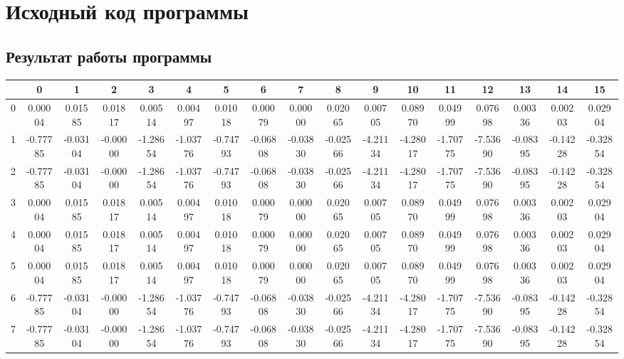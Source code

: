 \documentclass[11pt]{article}
\begin{document}
\section{Исходный код программы}
\small

\pagebreak{}
\begin{landscape}
\section{Результат работы программы}
\footnotesize
\begin{tabular}{|c|c|c|c|c|c|c|c|c|c|c|c|c|c|c|c|c|}
\hline
&0 & 1 & 2 & 3 & 4 & 5 & 6 & 7 & 8 & 9 & 10 & 11 & 12 & 13 & 14 & 15\\
\hline
   0 & 0.00004 &   0.01585 &   0.01817 &   0.00514 &   0.00497 &   0.01018 &   0.00079 &   0.00000 &   0.02065 &   0.00705 &   0.08970 &   0.04999 &   0.07698 &   0.00336 &   0.00203 &   0.02904\\
\hline
  1 & -0.77785 &  -0.03104 &  -0.00000 &  -1.28654 &  -1.03776 &  -0.74793 &  -0.06808 &  -0.03830 &  -0.02566 &  -4.21134 &  -4.28017 &  -1.70775 &  -7.53690 &  -0.08395 &  -0.14228 &  -0.32854\\
\hline
  2 & -0.77785 &  -0.03104 &  -0.00000 &  -1.28654 &  -1.03776 &  -0.74793 &  -0.06808 &  -0.03830 &  -0.02566 &  -4.21134 &  -4.28017 &  -1.70775 &  -7.53690 &  -0.08395 &  -0.14228 &  -0.32854\\
\hline
   3 & 0.00004 &   0.01585 &   0.01817 &   0.00514 &   0.00497 &   0.01018 &   0.00079 &   0.00000 &   0.02065 &   0.00705 &   0.08970 &   0.04999 &   0.07698 &   0.00336 &   0.00203 &   0.02904\\
\hline
   4 & 0.00004 &   0.01585 &   0.01817 &   0.00514 &   0.00497 &   0.01018 &   0.00079 &   0.00000 &   0.02065 &   0.00705 &   0.08970 &   0.04999 &   0.07698 &   0.00336 &   0.00203 &   0.02904\\
\hline
   5 & 0.00004 &   0.01585 &   0.01817 &   0.00514 &   0.00497 &   0.01018 &   0.00079 &   0.00000 &   0.02065 &   0.00705 &   0.08970 &   0.04999 &   0.07698 &   0.00336 &   0.00203 &   0.02904\\
\hline
  6 & -0.77785 &  -0.03104 &  -0.00000 &  -1.28654 &  -1.03776 &  -0.74793 &  -0.06808 &  -0.03830 &  -0.02566 &  -4.21134 &  -4.28017 &  -1.70775 &  -7.53690 &  -0.08395 &  -0.14228 &  -0.32854\\
\hline
  7 & -0.77785 &  -0.03104 &  -0.00000 &  -1.28654 &  -1.03776 &  -0.74793 &  -0.06808 &  -0.03830 &  -0.02566 &  -4.21134 &  -4.28017 &  -1.70775 &  -7.53690 &  -0.08395 &  -0.14228 &  -0.32854\\

\end{tabular}
\end{landscape}
\end{document}
